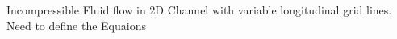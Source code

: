 Incompressible Fluid flow in 2D Channel with variable longitudinal
grid lines. Need to define the Equaions
